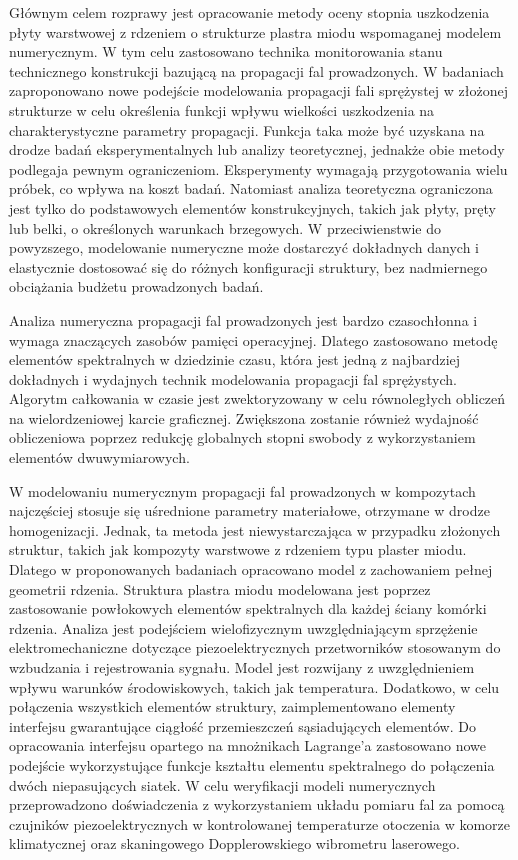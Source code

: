 {
Głównym celem rozprawy jest opracowanie metody oceny stopnia uszkodzenia płyty warstwowej z rdzeniem o strukturze plastra miodu wspomaganej modelem numerycznym.
W tym celu zastosowano technika monitorowania stanu technicznego konstrukcji bazującą na propagacji fal prowadzonych.
W badaniach zaproponowano nowe podejście modelowania propagacji fali sprężystej w złożonej strukturze w celu określenia funkcji wpływu wielkości uszkodzenia na charakterystyczne parametry propagacji.
Funkcja taka może być uzyskana na drodze badań eksperymentalnych lub analizy teoretycznej, jednakże obie metody podlegaja pewnym ograniczeniom.
Eksperymenty wymagają przygotowania wielu próbek, co wpływa na koszt badań.
Natomiast analiza teoretyczna ograniczona jest tylko do podstawowych elementów konstrukcyjnych, takich jak płyty, pręty lub belki, o określonych warunkach brzegowych. 
W przeciwienstwie do powyzszego, modelowanie numeryczne może dostarczyć dokładnych danych i elastycznie dostosować się do różnych konfiguracji struktury, bez nadmiernego obciążania budżetu prowadzonych badań.

Analiza numeryczna propagacji fal prowadzonych jest bardzo czasochłonna i wymaga znaczących zasobów pamięci operacyjnej.
Dlatego zastosowano metodę elementów spektralnych w dziedzinie czasu, która jest jedną z najbardziej dokładnych i wydajnych technik modelowania propagacji fal sprężystych.
Algorytm całkowania w czasie jest zwektoryzowany w celu równoległych obliczeń na wielordzeniowej karcie graficznej.
Zwiększona zostanie również wydajność obliczenio\-wa poprzez redukcję globalnych stopni swobody z wykorzystaniem elementów dwuwymiarowych.

W modelowaniu numerycznym propagacji fal prowadzonych w kompozytach najczęściej stosuje się uśrednione parametry materiałowe, otrzymane w drodze homogenizacji.
Jednak, ta metoda jest niewystarczająca w przypadku złożonych struktur, takich jak kompozyty warstwowe z rdzeniem typu plaster miodu.
Dlatego w proponowanych badaniach opracowano model z zachowaniem pełnej geometrii rdzenia.
Struktura plastra miodu modelowana jest poprzez zastosowanie powłokowych elementów spektralnych dla każdej ściany komórki rdzenia.
Analiza jest podejściem wielofizycznym uwzględniającym sprzężenie elektromechaniczne dotyczące piezoelektrycznych przetworników stosowanym do wzbudzania i rejestrowania sygnału.
Model jest rozwijany z uwzględnieniem wpływu warunków środowiskowych, takich jak temperatura.
Dodatkowo, w celu połączenia wszystkich elementów struktury, zaimplementowano elementy interfejsu gwarantujące ciągłość przemieszczeń sąsiadujących elementów.
Do opracowania interfejsu opartego na mnożnikach Lagrange'a zastosowano nowe podejście wykorzystujące funkcje kształtu elementu spektralnego do połączenia dwóch niepasujących siatek.
W celu weryfikacji modeli numerycznych przeprowadzono doświadczenia z wykorzystaniem układu  pomiaru fal za pomocą czujników piezoelektrycznych w kontrolowanej temperaturze otoczenia w komorze klimatycznej oraz skaningowego Dopplerowskiego wibrometru laserowego.

}
